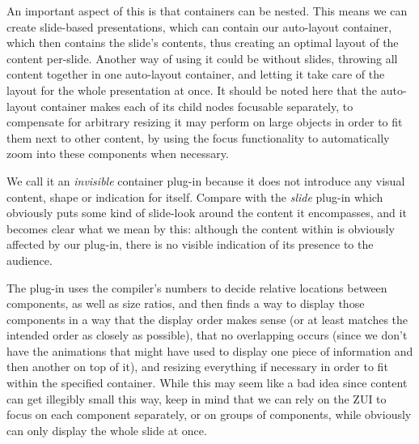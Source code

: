    An important aspect of this is that containers can be nested. This means we
   can create slide-based presentations, which can contain our auto-layout
   container, which then contains the slide's contents, thus creating an
   optimal layout of the content per-slide. Another way of using it could be
   without slides, throwing all content together in one auto-layout container,
   and letting it take care of the layout for the whole presentation at once.
   It should be noted here that the auto-layout container makes each of its
   child nodes focusable separately, to compensate for arbitrary resizing it
   may perform on large objects in order to fit them next to other content, by
   using the focus functionality to automatically zoom into these components
   when necessary.
  
   We call it an \emph{invisible} container plug-in because it does not
   introduce any visual content, shape or indication for itself. Compare with
   the \emph{slide} plug-in which obviously puts some kind of slide-look around
   the content it encompasses, and it becomes clear what we mean by this:
   although the content within is obviously affected by our plug-in, there is
   no visible indication of its presence to the audience.

   The plug-in uses the compiler's numbers to decide relative locations between
   components, as well as size ratios, and then finds a way to display those
   components in a way that the display order makes sense (or at least matches
   the intended order as closely as possible), that no overlapping occurs
   (since we don't have the animations that \ppt might have used to display one
   piece of information and then another on top of it), and resizing everything
   if necessary in order to fit within the specified container. While this may
   seem like a bad idea since content can get illegibly small this way, keep in
   mind that we can rely on the ZUI to focus on each component separately, or
   on groups of components, while \ppt obviously can only display the whole
   slide at once.


